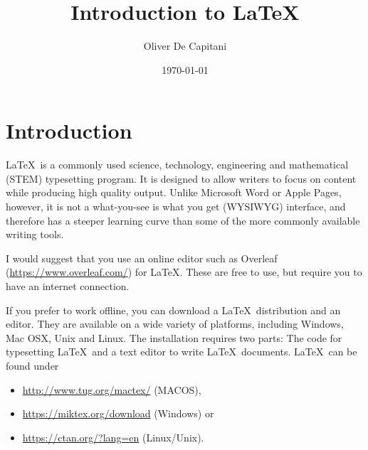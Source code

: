 \documentclass[12pt,a4paper]{article} %
\title{Introduction to \LaTeX}
\date{\today}
\author{Oliver De Capitani}
\begin{document}
\maketitle %
% 










\newpage %
\tableofcontents %











\newpage


\section{Introduction}

\LaTeX\  is a commonly used science, technology, engineering and mathematical (STEM) typesetting program. It is designed to allow writers to focus on content while producing high quality output. Unlike Microsoft Word or Apple Pages, however, it is not a what-you-see is what you get (WYSIWYG) interface, and therefore has a steeper learning curve than some of the more commonly available writing tools. 

I would suggest that you use an online editor such as Overleaf (\url{https://www.overleaf.com/}) for \LaTeX. These are free to use, but require you to have an internet connection.

If you prefer to work offline, you can download a \LaTeX\  distribution and an editor.
They are available on a wide variety of platforms, including Windows, Mac OSX, Unix and Linux. The installation requires two parts: The code for typesetting \LaTeX\  and a text editor to write \LaTeX\ documents.
\LaTeX\  can be found under
\begin{itemize}
\item \url{http://www.tug.org/mactex/} (MACOS), 
\item \url{https://miktex.org/download} (Windows) or
\item \url{https://ctan.org/?lang=en} (Linux/Unix). 
\end{itemize} 
\end{document}
